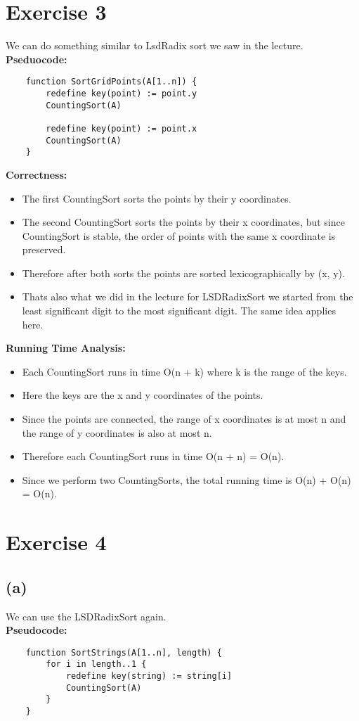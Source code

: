 \documentclass{article}
\begin{document}
\section*{Exercise 3}
We can do something similar to LsdRadix sort we saw in the lecture. \\
\textbf{Pseduocode:}
\begin{verbatim}
    function SortGridPoints(A[1..n]) {
        redefine key(point) := point.y
        CountingSort(A)

        redefine key(point) := point.x
        CountingSort(A)
    }
\end{verbatim}

\textbf{Correctness:}
\begin{itemize}
    \item The first CountingSort sorts the points by their y coordinates.
    \item The second CountingSort sorts the points by their x coordinates, but since CountingSort is stable, the order of points with the same x coordinate is preserved.
    \item Therefore after both sorts the points are sorted lexicographically by (x, y).
    \item Thats also what we did in the lecture for LSDRadixSort we started from the least significant digit to the most significant digit. The same idea applies here.
\end{itemize}

\textbf{Running Time Analysis:}
\begin{itemize}
    \item Each CountingSort runs in time O(n + k) where k is the range of the keys.
    \item Here the keys are the x and y coordinates of the points.
    \item Since the points are connected, the range of x coordinates is at most n and the range of y coordinates is also at most n.
    \item Therefore each CountingSort runs in time O(n + n) = O(n).
    \item Since we perform two CountingSorts, the total running time is O(n) + O(n) = O(n).
\end{itemize}

\section*{Exercise 4}
\subsection*{(a)}
We can use the LSDRadixSort again. \\
\textbf{Pseudocode:}
\begin{verbatim}
    function SortStrings(A[1..n], length) {
        for i in length..1 {
            redefine key(string) := string[i]
            CountingSort(A)
        }
    }
\end{verbatim}
\end{document}
